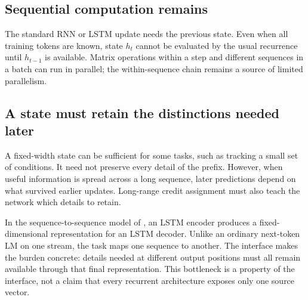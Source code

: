 
\subsection*{Sequential computation remains}
The standard RNN or LSTM update needs the previous state. Even when all
training tokens are known, state $h_t$ cannot be evaluated by the usual
recurrence until $h_{t-1}$ is available. Matrix operations within a step
and different sequences in a batch can run in parallel; the within-sequence
chain remains a source of limited parallelism.


\subsection*{A state must retain the distinctions needed later}
A fixed-width state can be sufficient for some tasks, such as tracking a
small set of conditions. It need not preserve every detail of the prefix.
However, when useful information is spread across a long sequence, later
predictions depend on what survived earlier updates. Long-range credit
assignment must also teach the network which details to retain.


In the sequence-to-sequence model of , an LSTM encoder
produces a fixed-dimensional representation for an LSTM decoder. Unlike
an ordinary next-token LM on one stream, the task maps one sequence to
another. The interface makes the burden concrete: details needed at
different output positions must all remain available through that final
representation. This bottleneck is a property of the interface, not a
claim that every recurrent architecture exposes only one source vector.


